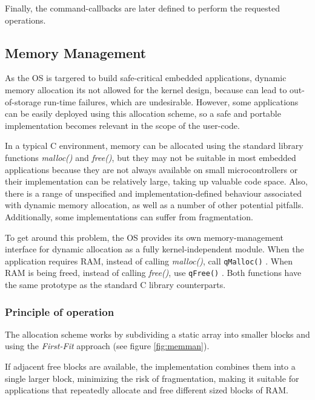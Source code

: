 

Finally, the command-callbacks are later defined to perform the requested operations.



\subsection{Memory Management} \label{memmanagement}
As the OS is targered to build safe-critical embedded applications, dynamic memory allocation its not allowed for the kernel design, because can lead to out-of-storage run-time failures, which are undesirable. However, some applications can be easily deployed using this allocation scheme, so a safe and portable implementation becomes relevant in the scope of the user-code. 

In a typical C environment, memory can be allocated using the standard library functions  \textit{malloc()} and \textit{free()}, but they may not be suitable in most embedded applications because they are not always available on small microcontrollers or their implementation can be relatively large, taking up valuable code space. Also, there is a range of unspecified and implementation-defined behaviour associated with dynamic memory allocation, as well as a number of other potential pitfalls. Additionally, some implementations can suffer from fragmentation.

To get around this problem, the OS provides its own memory-management interface for dynamic allocation as a fully kernel-independent module. When the application requires RAM, instead of calling \textit{malloc()},  call \lstinline{qMalloc()} . When RAM is being freed, instead of calling \textit{free()}, use \lstinline{qFree()} . Both functions have the same prototype as the standard C library counterparts.

\subsubsection{Principle of operation}
The allocation scheme works by subdividing a static array into smaller blocks and using the \textit{First-Fit} approach (see figure \ref{fig:memman}). 

If adjacent free blocks are available, the implementation combines them into a single larger block, minimizing the risk of fragmentation, making it suitable for applications that repeatedly allocate and free different sized blocks of RAM.

